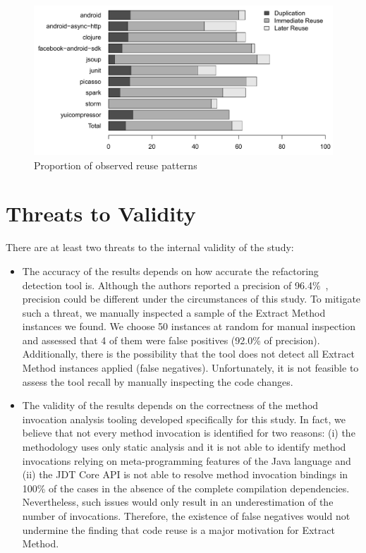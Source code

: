 \begin{figure}[htbp]\centering
\includegraphics[width=1\textwidth]{img/ch5/barchart2.pdf}
\caption{Proportion of observed reuse patterns}
\label{ireuse}
\end{figure}


\section{Threats to Validity}
\label{sameacas}

There are at least two threats to the internal validity of the study:
\begin{itemize}
\item The accuracy of the results depends on how accurate the refactoring detection tool is. Although the authors reported a precision of  96.4\%~\citep{tsantalis_empiricalstudy}, precision could be different under the circumstances of this study.
To mitigate such a threat, we manually inspected a sample of the Extract Method instances we found. We choose 50 instances at random for manual inspection and assessed that 4 of them were false positives (92.0\% of precision).
Additionally, there is the possibility that the tool does not detect all Extract Method instances applied (false negatives). Unfortunately, it is not feasible to assess the tool recall by manually inspecting the code changes.

\item The validity of the results depends on the correctness of the method invocation analysis tooling developed specifically for this study. In fact, we believe that not every method invocation is identified for two reasons: (i) the methodology uses only static analysis and it is not able to identify method invocations relying on meta-programming features of the Java language and (ii) the JDT Core API is not able to resolve method invocation bindings in 100\% of the cases in the absence of the complete compilation dependencies.
Nevertheless, such issues would only result in an underestimation of the number of invocations. Therefore, the existence of false negatives would not undermine the finding that code reuse is a major motivation for Extract Method.
\end{itemize}

